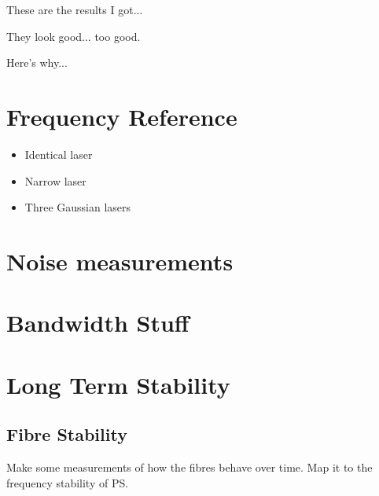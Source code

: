 These are the results I got...

They look good... too good.

Here's why...\cite{richter_linewidth_1986}

\section{Frequency Reference}
\begin{itemize}
\item Identical laser
\item Narrow laser
\item Three Gaussian lasers
\end{itemize}

\section{Noise measurements}

\section{Bandwidth Stuff}

\section{Long Term Stability}

\subsection{Fibre Stability}

Make some measurements of how the fibres behave over time. Map it to the frequency stability of PS.

